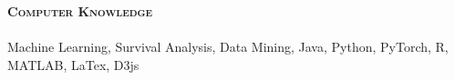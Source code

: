 \documentclass[11pt]{article}
\makeatletter
\newcommand{\lineunder}{\vspace*{-8pt} \\ \hspace*{-18pt} \hrulefill \\}
\newcommand{\header}[1]{{\hspace*{-15pt}\vspace*{6pt} \large \textsc{\textbf{#1}}} \vspace*{-6pt} \lineunder}
\newenvironment{achievements}{\begin{list}{$\bullet$}{\topsep 0pt \itemsep -2pt}}{\vspace*{4pt}\end{list}}
\newcommand{\headerrow}[2]
{\begin{tabular*}{\linewidth}{l@{\extracolsep{\fill}}r}
	\hspace*{-15pt}#1 & #2 \\
\end{tabular*}}
\newcommand{\CPP}
 {C\nolinebreak[4]\hspace{-.05em}\raisebox{.22ex}{\footnotesize\bf ++}}
\makeatother
\begin{document}





\vspace*{1.5pt}
\header{Computer Knowledge}
Machine Learning, Survival Analysis, Data Mining, Java, Python, PyTorch, R, MATLAB, LaTex, D3js
\end{document}
